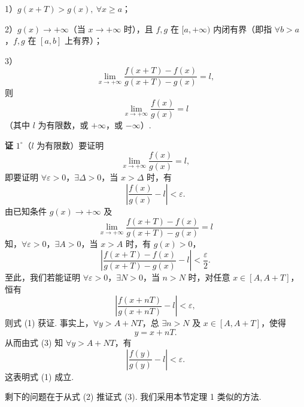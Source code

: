 \documentclass[UTF8,12pt,a4paper,fontset=fandol]{ctexart}
\begin{document}
1）$g(x+T)>g(x),\ \forall x\ge a$；

2）$g(x)\to+\infty$（当 $x\to+\infty$ 时），且 $f,g$ 在 $[a,+\infty)$ 内闭有界（即指 $\forall b>a$，$f,g$ 在 $[a,b]$ 上有界）；

3）
\[
  \lim_{x\to+\infty}\frac{f(x+T)-f(x)}{g(x+T)-g(x)}=l,
\]
则
\[
  \lim_{x\to+\infty}\frac{f(x)}{g(x)}=l
\]
（其中 $l$ 为有限数，或 $+\infty$，或 $-\infty$）.

\noindent\textbf{证}\quad
$1^\circ$（$l$ 为有限数）要证明
\[
  \lim_{x\to+\infty}\frac{f(x)}{g(x)}=l,
\]
即要证明 $\forall\varepsilon>0$，$\exists\Delta>0$，当 $x>\Delta$ 时，有
\[
  \left|\frac{f(x)}{g(x)}-l\right|<\varepsilon. \tag{1}
\]
由已知条件 $g(x)\to+\infty$ 及
\[
  \lim_{x\to+\infty}\frac{f(x+T)-f(x)}{g(x+T)-g(x)}=l
\]
知，$\forall\varepsilon>0$，$\exists A>0$，当 $x>A$ 时，有 $g(x)>0$，
\[
  \left|\frac{f(x+T)-f(x)}{g(x+T)-g(x)}-l\right|<\frac\varepsilon2. \tag{2}
\]
至此，我们若能证明 $\forall\varepsilon>0$，$\exists N>0$，当 $n>N$ 时，对任意
$x\in[A,A+T]$，恒有
\[
  \left|\frac{f(x+nT)}{g(x+nT)}-l\right|<\varepsilon, \tag{3}
\]
则式 (1) 获证. 事实上，$\forall y>A+NT$，总 $\exists n>N$ 及
$x\in[A,A+T]$，使得
\[
  y=x+nT.
\]
从而由式 (3) 知 $\forall y>A+NT$，有
\[
  \left|\frac{f(y)}{g(y)}-l\right|<\varepsilon.
\]
这表明式 (1) 成立.

剩下的问题在于从式 (2) 推证式 (3). 我们采用本节定理 1 类似的方法.
\end{document}
